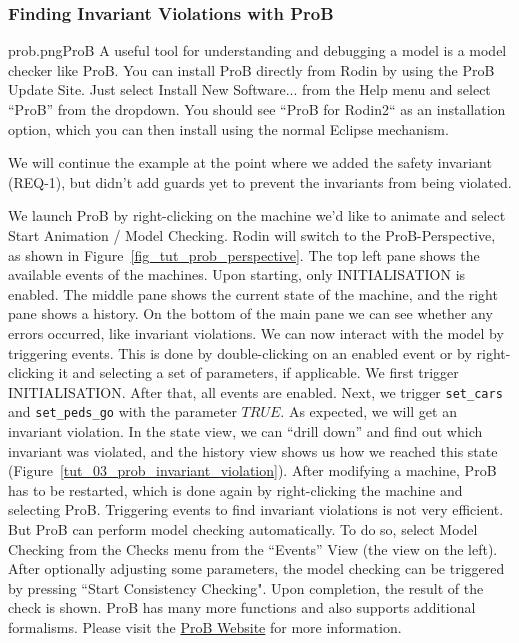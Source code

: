 \subsubsection{Finding Invariant Violations with ProB}
\label{tut:prob}
\begin{rodin-plugin}{prob.png}{ProB}
A useful tool for understanding and debugging a model is a model checker like ProB. You can install ProB directly from Rodin by using the ProB Update Site.  Just select \textsf{Install New Software...} from the \textsf{Help} menu and select ``ProB'' from the dropdown. You should see ``ProB for Rodin2`` as an installation option, which you can then install using the normal Eclipse mechanism. 

We will continue the example at the point where we added the safety invariant (REQ-1), but didn't add guards yet to prevent the invariants from being violated.

We launch ProB by right-clicking on the machine we'd like to animate and select \textsf{Start Animation / Model Checking}.  Rodin will switch to the ProB-Perspective, as shown in Figure~\ref{fig_tut_prob_perspective}. The top left pane shows the available events of the machines.  Upon starting, only INITIALISATION is enabled.  The middle pane shows the current state of the machine, and the right pane shows a history.  On the bottom of the main pane we can see whether any errors occurred, like invariant violations. We can now interact with the model by triggering events.  This is done by double-clicking on an enabled event or by right-clicking it and selecting a set of parameters, if applicable.  We first trigger INITIALISATION.  After that, all events are enabled.  Next, we trigger \texttt{set\_cars} and \texttt{set\_peds\_go}  with the parameter $TRUE$.  As expected, we will get an invariant violation.  In the state view, we can ``drill down'' and find out which invariant was violated, and the history view shows us how we reached this state (Figure~\ref{tut_03_prob_invariant_violation}). After modifying a machine, ProB has to be restarted, which is done again by right-clicking the machine and selecting ProB.  Triggering events to find invariant violations is not very efficient.  But ProB can perform model checking automatically.  To do so, select \textsf{Model Checking} from the \textsf{Checks} menu from the ``Events'' View (the view on the left).  After optionally adjusting some parameters, the model checking can be triggered by pressing ``Start Consistency Checking".  Upon completion, the result of the check is shown. ProB has many more functions and also supports additional formalisms. Please visit the \href{http://www.stups.uni-duesseldorf.de/ProB}{ProB Website} for more information.

\end{rodin-plugin}

